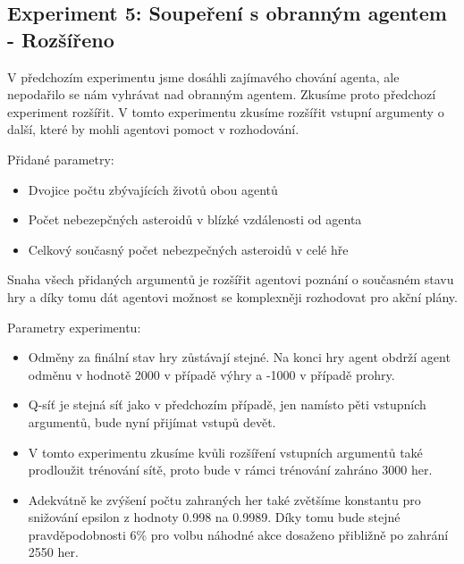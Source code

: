 \subsection{Experiment 5: Soupeření s obranným agentem - Rozšířeno}
V předchozím experimentu jsme dosáhli zajímavého chování agenta, ale nepodařilo se nám vyhrávat nad obranným agentem.
Zkusíme proto předchozí experiment rozšířit. 
V tomto experimentu zkusíme rozšířit vstupní argumenty o další, které by mohli agentovi pomoct v rozhodování.

Přidané parametry:
\begin{itemize}
    \item Dvojice počtu zbývajících životů obou agentů            
    \item Počet nebezepčných asteroidů v blízké vzdálenosti od agenta
    \item Celkový současný počet nebezpečných asteroidů v celé hře
\end{itemize}
Snaha všech přidaných argumentů je rozšířit agentovi poznání o současném stavu hry a díky tomu dát agentovi možnost se komplexněji rozhodovat pro akční plány.

Parametry experimentu:
\begin{itemize}
    \item Odměny za finální stav hry zůstávají stejné. Na konci hry agent obdrží agent odměnu v hodnotě 2000 v případě výhry a -1000 v případě prohry.
    \item Q-síť je stejná síť jako v předchozím případě, jen namísto pěti vstupních argumentů, bude nyní přijímat vstupů devět.
    \item V tomto experimentu zkusíme kvůli rozšíření vstupních argumentů také prodloužit trénování sítě, proto bude v rámci trénování zahráno 3000 her.
    \item Adekvátně ke zvýšení počtu zahraných her také zvětšíme konstantu pro snižování epsilon z hodnoty 0.998 na 0.9989. Díky tomu bude stejné pravděpodobnosti 6\% pro volbu náhodné akce dosaženo přibližně po zahrání 2550 her.
\end{itemize}


\newline
{}\newline
{}\newline
{}\newline
{}\newline
{}\newline
{}\newline






